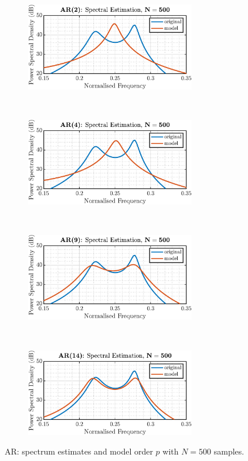 \begin{enumerate}[label=\alph*), leftmargin=*]
\begin{figure}[h]
    \centering
    \begin{subfigure}{0.49\textwidth}
        \centering
        \includegraphics[height=1.5in]{report/parametric-and-line-spectra/spectrum-of-autoregressive-processes/assets/b/ar_2}
    \end{subfigure}
    ~ 
    \begin{subfigure}{0.49\textwidth}
        \centering
        \includegraphics[height=1.5in]{report/parametric-and-line-spectra/spectrum-of-autoregressive-processes/assets/b/ar_4}
    \end{subfigure}
    ~
    ~
    \begin{subfigure}{0.49\textwidth}
        \centering
        \includegraphics[height=1.5in]{report/parametric-and-line-spectra/spectrum-of-autoregressive-processes/assets/b/ar_9}
    \end{subfigure}
    ~
    \begin{subfigure}{0.49\textwidth}
        \centering
        \includegraphics[height=1.5in]{report/parametric-and-line-spectra/spectrum-of-autoregressive-processes/assets/b/ar_14}
    \end{subfigure}
    \caption{AR: spectrum estimates and model order $p$ with $N=500$ samples.}
    \label{fig:2_2_b_1}
\end{figure}


\end{enumerate}
